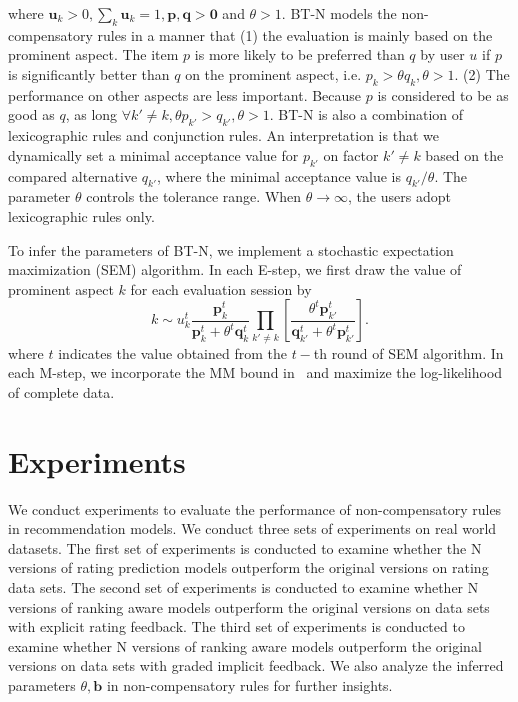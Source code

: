 \documentclass[letterpaper]{article} %
\begin{document}
where $\mathbf{u}_k >0, \sum_k \mathbf{u}_k=1,\mathbf{p,q}>\mathbf{0}$ and $\theta>1$.  BT-N models the non-compensatory rules in a manner that (1) the evaluation is mainly based on the prominent aspect. The item $p$ is more likely to be preferred than $q$ by user $u$ if $p$ is significantly better than $q$ on the prominent aspect, i.e. $p_{k} > \theta q_{k}, \theta>1$. (2) The performance on other aspects are less  important. Because $p$ is considered to be as good as $q$, as long $\forall k'\neq k, \theta p_{k'} >  q_{k'}, \theta>1$.  BT-N is also a combination of lexicographic rules and conjunction rules. An interpretation is that we dynamically set a minimal acceptance value for $p_{k'}$ on factor $k'\neq k$ based on the compared alternative $q_{k'}$, where the minimal acceptance value is $q_{k'}/\theta$.  The parameter $\theta$ controls the tolerance range. When $\theta \rightarrow \infty$, the users adopt lexicographic rules only.

To infer the parameters of BT-N, we implement a stochastic expectation maximization (SEM) algorithm. In each E-step, we first draw the value of prominent aspect $k$ for each evaluation session by
 \begin{equation}
 k \sim u_k^{t} \frac{\mathbf{p}_{k}^t} {\mathbf{p}_{k}^t+\theta^t \mathbf{q}_{k}^t} \prod_{k'\neq k}  [\frac{\theta^t \mathbf{p}_{k'}^t} {\mathbf{q}_{k'}^t + \theta^t \mathbf{p}_{k'}^t}].
 \end{equation}
 where $t$ indicates the value obtained from the $t-$th round of SEM algorithm.
 In each M-step, we incorporate the MM bound in~\cite{Hunter2004MM} and maximize the log-likelihood of complete data. 




\section{Experiments}\label{sec:experiment}
We conduct experiments to evaluate the performance of non-compensatory rules in recommendation models. We conduct three sets of experiments on real world datasets. The first set of experiments is conducted to examine whether the N versions of rating prediction models outperform the original versions on rating data sets. 
The second set of experiments is conducted to examine whether N versions of ranking aware models outperform the original versions on data sets with explicit rating feedback.
The third set of experiments is conducted to examine whether N versions of ranking aware models outperform the original versions on data sets with graded implicit feedback. We also analyze the inferred parameters $\theta,\mathbf{b}$ in non-compensatory rules for further insights.
\end{document}
